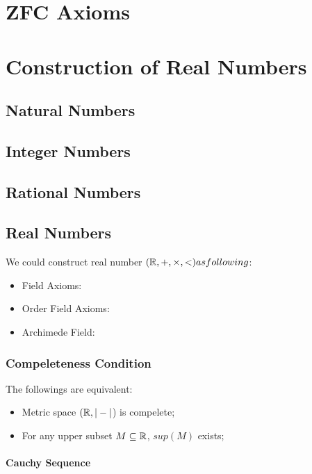 \documentclass[Total.tex]{subfiles}
\begin{document}
	\chapter{ZFC Axioms}
	\chapter{Construction of Real Numbers}
		\section{Natural Numbers}
		\section{Integer Numbers}
		\section{Rational Numbers}
		\section{Real Numbers}
			\begin{axiom}
				We could construct real number $(\mathbb{R},+,\times,<) as following$:
				
				\begin{itemize}
					\item Field Axioms:
					\item Order Field Axioms:
					\item Archimede Field: 
				\end{itemize}
			\end{axiom}
			\subsection{Compeleteness Condition}
				
				\begin{proposition}
					The followings are equivalent:
					\begin{itemize}
						\item Metric space $(\mathbb{R},|-|$) is compelete;
						\item For any upper subset $M\subseteq \mathbb{R}$, $sup(M)$ exists;
					\end{itemize}
				\end{proposition}
				
				\subsubsection{Cauchy Sequence}
				
\end{document}
